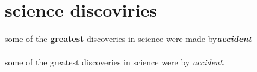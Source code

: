 \documentclass{article}
\begin{document}
	
	\section{science discoviries}
	some of the \textbf{greatest} discoveries in \underline{science} were made by\textbf{\textit{accident}}
	
	\paragraph{}
	some of the greatest discoveries in science were by \emph{accident}.
\end{document}
